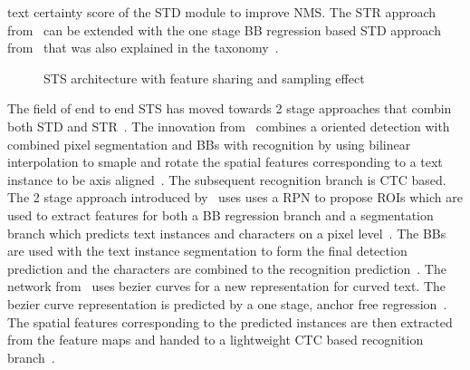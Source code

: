 text certainty score of the \ac{STD} module to improve \ac{NMS}.
The \ac{STR} approach from~\cite{shi_aster_2019} can be extended with the one stage
\ac{BB} regression based \ac{STD} approach from~\cite{liao_textboxes_2017} that was also explained
in the taxonomy~\citep{shi_aster_2019}.
\begin{figure}[ht]
    \centering
    \caption[STS architecture with feature sharing]{%
        STS architecture with feature sharing and sampling
        effect~\citep{liu_fots_2018}\label{fig:2-stage-example-LIU-Fots-2018}
    }
\end{figure}
The field of end to end \ac{STS} has moved towards 2 stage approaches that combin both \ac{STD}
and \ac{STR}~\citep{lyu_mask_2018,long_scene_2021}.
The innovation from~\cite{liu_fots_2018} combines a oriented detection with combined pixel
segmentation and \acp{BB} with recognition by using bilinear interpolation to smaple and rotate
the spatial features corresponding to a text instance to be axis aligned~\citep{liu_fots_2018}.
The subsequent recognition branch is \ac{CTC} based.
The 2 stage approach introduced by~\cite{lyu_mask_2018} uses uses a \ac{RPN} to propose \acp{ROI}
which are used to extract features for both a \ac{BB} regression branch and a segmentation branch
which predicts text instances and characters on a pixel level~\citep{lyu_mask_2018}.
The \acp{BB} are used with the text instance segmentation to form the final detection prediction and
the characters are combined to the recognition prediction~\citep{lyu_mask_2018}.
The network from~\cite{liu_abcnet_2020} uses bezier curves for a new representation for curved text.
The bezier curve representation is predicted by a one stage, anchor free
regression~\citep{liu_abcnet_2020}.
The spatial features corresponding to the predicted instances are then extracted from the feature
maps and handed to a lightweight \ac{CTC} based recognition branch~\citep{lyu_mask_2018}.
